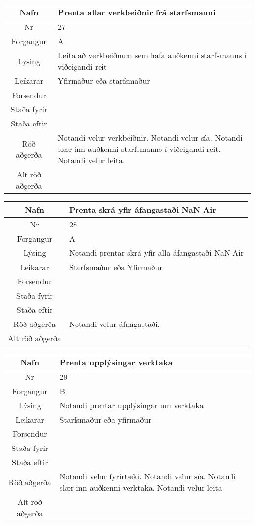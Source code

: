 \begin{table}[h!]\centering
\begin{tabular}{|c|p{10cm}|}
\hline
Nafn&Prenta allar verkbeiðnir frá starfsmanni\\
\hline
Nr&27\\
\hline
Forgangur&A\\
\hline
Lýsing&Leita að verkbeiðnum sem hafa auðkenni starfsmanns í viðeigandi reit\\
\hline
Leikarar&Yfirmaður eða starfsmaður\\
\hline
Forsendur&\\
\hline
Staða fyrir&\\
\hline
Staða eftir&\\
\hline
Röð aðgerða&Notandi velur verkbeiðnir. Notandi velur sía. Notandi slær inn auðkenni starfsmanns í viðeigandi reit. Notandi velur leita.\\
\hline
Alt röð aðgerða&\\
\hline
\end{tabular}
\end{table}
\caption{Use case 27}\label{tab:use_case_27}
\begin{table}[h!]\centering
\begin{tabular}{|c|p{10cm}|}
\hline
Nafn&Prenta skrá yfir áfangastaði NaN Air\\
\hline
Nr&28\\
\hline
Forgangur&A\\
\hline
Lýsing&Notandi prentar skrá yfir alla áfangastaði NaN Air\\
\hline
Leikarar&Starfsmaður eða Yfirmaður\\
\hline
Forsendur&\\
\hline
Staða fyrir&\\
\hline
Staða eftir&\\
\hline
Röð aðgerða&Notandi velur áfangastaði.\\
\hline
Alt röð aðgerða&\\
\hline
\end{tabular}
\end{table}
\caption{Use case 28}\label{tab:use_case_28}
\begin{table}[h!]\centering
\begin{tabular}{|c|p{10cm}|}
\hline
Nafn&Prenta upplýsingar verktaka\\
\hline
Nr&29\\
\hline
Forgangur&B\\
\hline
Lýsing&Notandi prentar upplýsingar um verktaka\\
\hline
Leikarar&Starfsmaður eða yfirmaður\\
\hline
Forsendur&\\
\hline
Staða fyrir&\\
\hline
Staða eftir&\\
\hline
Röð aðgerða&Notandi velur fyrirtæki. Notandi velur sía. Notandi slær inn auðkenni verktaka. Notandi velur leita\\
\hline
Alt röð aðgerða&\\
\hline
\end{tabular}
\end{table}
